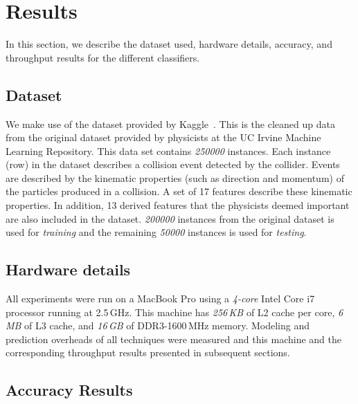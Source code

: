 \section{Results}
\label{sec:results}

In this section, we describe the dataset used, hardware details, accuracy, and throughput results for the different classifiers.

\subsection{Dataset}

We make use of the dataset provided by Kaggle~\cite{Kaggle-Dataset}. This is the cleaned up data from the original dataset provided by physicists at the UC Irvine Machine Learning Repository. This data set contains \emph{250000} instances. Each instance (row) in the dataset describes a collision event detected by the collider. Events are described by the kinematic properties (such as direction and momentum) of the particles produced in a collision. A set of 17 features describe these kinematic properties. In addition, 13 derived features that the physicists deemed important are also included in the dataset. \emph{200000} instances from the original dataset is used for \emph{training} and the remaining \emph{50000} instances is used for \emph{testing}.

\subsection{Hardware details}

All experiments were run on a MacBook Pro using a \emph{4-core} Intel Core i7 processor running at 2.5\,GHz. This machine has \emph{256\,KB} of L2 cache per core, \emph{6\,MB} of L3 cache, and \emph{16\,GB} of DDR3-1600\,MHz memory. Modeling and prediction overheads of all techniques were measured and this machine and the corresponding throughput results presented in subsequent sections.

\subsection{Accuracy Results}

